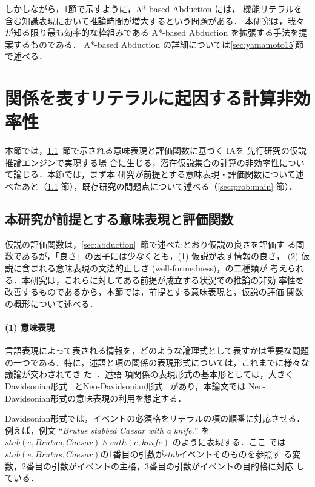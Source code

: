 \documentclass[japanese]{jnlp_1.4}
\begin{document}
しかしながら，\ref{sec:prob}節で示すように，A*-based Abduction には，
機能リテラルを含む知識表現において推論時間が増大するという問題がある．
本研究は，我々が知る限り最も効率的な枠組みである A*-based Abduction
を拡張する手法を提案するものである．
A*-based Abduction の詳細については\ref{sec:yamamoto15}節で述べる．


\section{関係を表すリテラルに起因する計算非効率性}
\label{sec:prob}

本節では，\ref{sec:prob:mr}~節で示される意味表現と評価関数に基づく IAを
先行研究の仮説推論エンジン\cite{Inoue11,Inoue12b,Yamamoto15}で実現する場
合に生じる，潜在仮説集合の計算の非効率性について論じる．本節では，まず本
研究が前提とする意味表現・評価関数について述べたあと（\ref{sec:prob:mr} 節），既存研究の問題点について述べる（\ref{sec:prob:main} 節）．


\subsection{本研究が前提とする意味表現と評価関数}
\label{sec:prob:mr}


仮説の評価関数は，\ref{sec:abduction}~節で述べたとおり仮説の良さを評価す
る関数であるが，「良さ」の因子には少なくとも，(1) 仮説が表す情報の良さ，
(2) 仮説に含まれる意味表現の文法的正しさ (well-formedness)，の二種類が
考えられる．本研究は，これらに対してある前提が成立する状況での推論の非効
率性を改善するものであるから，本節では，前提とする意味表現と，仮説の評価
関数の概形について述べる．

\paragraph{(1) 意味表現　}
言語表現によって表される情報を，どのような論理式として表すかは重要な問題
の一つである．特に，述語と項の関係の表現形式については，これまでに様々な
議論が交わされてき
た~\cite[etc.]{Davidson,Hobbs85,Mccord90,neodavidson,Copestake05}．述語
項関係の表現形式の基本形としては，大きく Davidsonian形式~\cite{Davidson}
とNeo-Davidsonian形式~\cite{neodavidson} があり，本論文では
Neo-Davidsonian形式の意味表現の利用を想定する．

Davidsonian形式では，イベントの必須格をリテラルの項の順番に対応させる．
例えば，例文 ``{\it Brutus stabbed Caesar with a knife.}'' を
$\mathit{stab}(e,\mathit{Brutus},\mathit{Caesar}) \land \mathit{with}(e,\mathit{knife})$ のように表現する．ここ
では$\mathit{stab}(e,\mathit{Brutus},\mathit{Caesar})$の1番目の引数が$\mathit{stab}$イベントそのものを参照す
る変数，2番目の引数がイベントの主格，3番目の引数がイベントの目的格に対応
している．
\end{document}

